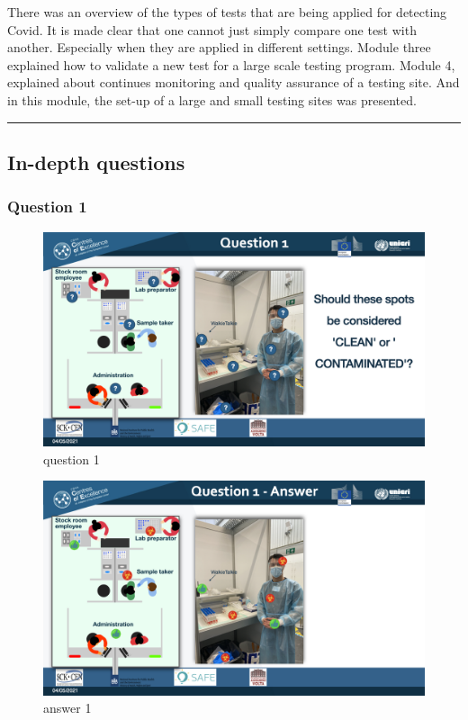 \documentclass[
]{book}
\begin{document}
There was an overview of the types of tests that are being applied for
detecting Covid. It is made clear that one cannot just simply compare
one test with another. Especially when they are applied in different
settings. Module three explained how to validate a new test for a large
scale testing program. Module 4, explained about continues monitoring
and quality assurance of a testing site. And in this module, the set-up
of a large and small testing sites was presented.

\begin{center}\rule{0.5\linewidth}{0.5pt}\end{center}

\hypertarget{in-depth-questions-3}{%
\subsection{In-depth questions}\label{in-depth-questions-3}}

\hypertarget{question-1-3}{%
\subsubsection{Question 1}\label{question-1-3}}

\begin{figure}
\centering
\includegraphics{images/m05/m05_questions_v2.001.jpeg}
\caption{question 1}
\end{figure}

\begin{figure}
\centering
\includegraphics{images/m05/m05_questions_v2.002.jpeg}
\caption{answer 1}
\end{figure}
\end{document}
